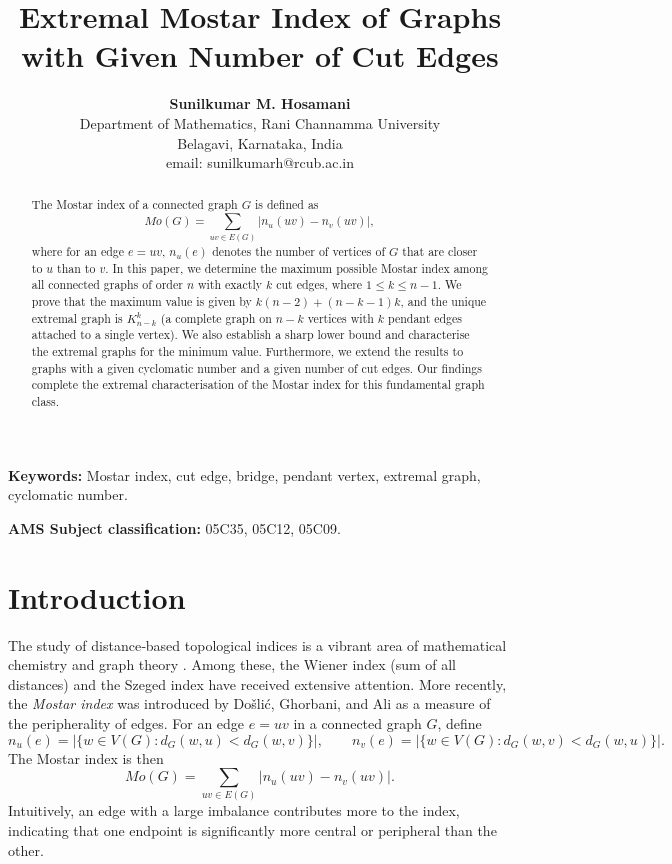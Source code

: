 \documentclass[12pt,a4paper]{article}
\title{\textbf{Extremal Mostar Index of Graphs with Given Number of Cut Edges}}
\author{\textbf{Sunilkumar M. Hosamani}\\
Department of Mathematics, Rani Channamma University\\
Belagavi, Karnataka, India\\
email: sunilkumarh@rcub.ac.in}
\date{}
\theoremstyle{definition}
\begin{document}
\maketitle

\begin{abstract}
The Mostar index of a connected graph \(G\) is defined as
\[
Mo(G)=\sum_{uv\in E(G)}\bigl|n_u(uv)-n_v(uv)\bigr|,
\]
where for an edge \(e=uv\), \(n_u(e)\) denotes the number of vertices of \(G\) that are closer to \(u\) than to \(v\). In this paper, we determine the maximum possible Mostar index among all connected graphs of order \(n\) with exactly \(k\) cut edges, where \(1\le k\le n-1\). We prove that the maximum value is given by \(k(n-2)+(n-k-1)k\), and the unique extremal graph is \(K_{n-k}^k\) (a complete graph on \(n-k\) vertices with \(k\) pendant edges attached to a single vertex). We also establish a sharp lower bound and characterise the extremal graphs for the minimum value. Furthermore, we extend the results to graphs with a given cyclomatic number and a given number of cut edges. Our findings complete the extremal characterisation of the Mostar index for this fundamental graph class.
\end{abstract}

\noindent\textbf{Keywords:} Mostar index, cut edge, bridge, pendant vertex, extremal graph, cyclomatic number.

\noindent\textbf{AMS Subject classification:} 05C35, 05C12, 05C09.

\section{Introduction}

The study of distance‑based topological indices is a vibrant area of mathematical chemistry and graph theory \cite{Todeschini2009, Gutman2013}. Among these, the Wiener index (sum of all distances) \cite{Wiener1947} and the Szeged index \cite{Gutman1996} have received extensive attention. More recently, the \emph{Mostar index} was introduced by Došlić, Ghorbani, and Ali \cite{Doslic2018} as a measure of the peripherality of edges. For an edge \(e=uv\) in a connected graph \(G\), define
\[
n_u(e)=\bigl|\{w\in V(G): d_G(w,u)<d_G(w,v)\}\bigr|,\qquad 
n_v(e)=\bigl|\{w\in V(G): d_G(w,v)<d_G(w,u)\}\bigr|.
\]
The Mostar index is then
\[
Mo(G)=\sum_{uv\in E(G)}\bigl|n_u(uv)-n_v(uv)\bigr|.
\]
Intuitively, an edge with a large imbalance contributes more to the index, indicating that one endpoint is significantly more central or peripheral than the other.
\end{document}
